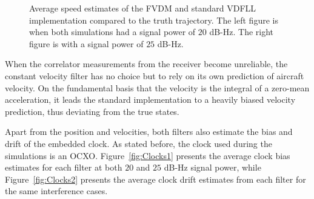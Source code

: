 \begin{figure}[!ht]
\begin{subfigure}{.45\textwidth}
    \end{subfigure}
    \caption{Average speed estimates of the FVDM and standard VDFLL implementation compared to the truth trajectory. The left figure is when both simulations had a signal power of \(20\) dB-Hz. The right figure is with a signal power of \(25\) dB-Hz.}\label{fig:Speed1}
\end{figure}

When the correlator measurements from the receiver become unreliable, the constant velocity filter has no choice but to rely on its own prediction of aircraft velocity. On the fundamental basis that the velocity is the integral of a zero-mean acceleration, it leads the standard implementation to a heavily biased velocity prediction, thus deviating from the true states.

Apart from the position and velocities, both filters also estimate the bias and drift of the embedded clock. As stated before, the clock used during the simulations is an OCXO\@. Figure~\ref{fig:Clocks1} presents the average clock bias estimates for each filter at both \(20\) and \(25\) dB-Hz signal power, while Figure~\ref{fig:Clocks2} presents the average clock drift estimates from each filter for the same interference cases.

